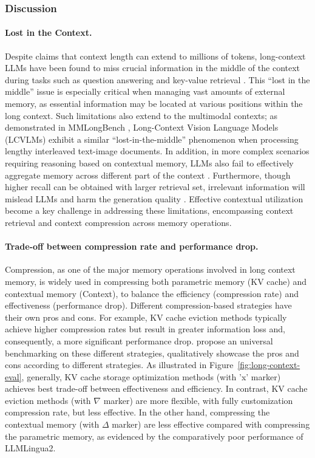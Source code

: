 \documentclass[manuscript,screen]{acmart}
\begin{document}
\subsubsection{Discussion}
\paragraph{Lost in the Context.}
Despite claims that context length can extend to millions of tokens, long-context LLMs have been found to miss crucial information in the middle of the context during tasks such as question answering and key-value retrieval \citep{liu2024lost, ravaut-etal-2024-context}. This ``lost in the middle'' issue is especially critical when managing vast amounts of external memory, as essential information may be located at various positions within the long context.
Such limitations also extend to the multimodal contexts; as demonstrated in MMLongBench \citep{wang2025mmlongbench}, Long-Context Vision Language Models (LCVLMs) exhibit a similar “lost-in-the-middle” phenomenon when processing lengthy interleaved text-image documents.
In addition, in more complex scenarios requiring reasoning based on contextual memory, LLMs also fail to effectively aggregate memory across different part of the context \citep{huang2025maskingmultihopqaanalysis}. Furthermore, though higher recall can be obtained with larger retrieval set, irrelevant information will mislead LLMs and harm the generation quality \citep{pmlr-v202-shi23a, jin2025longcontext}. Effective contextual utilization become a key challenge in addressing these limitations, encompassing context retrieval and context compression across memory operations.

\paragraph{Trade-off between compression rate and performance drop.} Compression, as one of the major memory operations involved in long context memory, is widely used in compressing both parametric memory (KV cache) and contextual memory (Context), to balance the efficiency (compression rate) and effectiveness (performance drop). Different compression-based strategies have their own pros and cons. For example, KV cache eviction methods typically achieve higher compression rates but result in greater information loss and, consequently, a more significant performance drop.  \citet{yuan-etal-2024-kv} propose an universal benchmarking on these different strategies, qualitatively showcase the pros and cons according to different strategies. As illustrated in Figure~\ref{fig:long-context-eval}, generally, KV cache storage optimization methods (with 'x' marker) achieves best trade-off between effectiveness and efficiency. In contrast, KV cache eviction methods (with $\nabla$ marker) are more flexible, with fully customization compression rate, but less effective. In the other hand, compressing the contextual memory (with $\Delta$ marker) are less effective compared with compressing the parametric memory, as evidenced by the comparatively poor performance of LLMLingua2.
\end{document}
